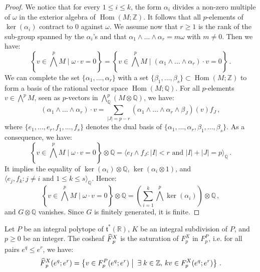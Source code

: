 \documentclass[AHL,Unicode,longabstracts,published]{cedram}
\newcommand{\R}{\mathbb{R}}
\newcommand{\Q}{\mathbb{Q}}
\newcommand{\Z}{\mathbb{Z}}
\renewcommand{\t}{\mathfrak{t}}
\DeclareMathOperator{\Hom}{Hom}
\newcommand{\Fbar}{\hat{F}}
\let\oldhat\hat
\renewcommand*{\hat}[1]{\mathchoice{\widehat{#1}}{\widehat{#1}}{\oldhat{#1}}{\oldhat{#1}}}
\let\oldexists\exists
\renewcommand*{\exists}{\mathrel{\oldexists}}
\begin{document}
\begin{proof}
We notice that for every $1\leq i\leq k$, the form $\alpha_i$ divides a non-zero multiple of $\omega$ in the exterior algebra of $\Hom(M;\Z)$. It follows that all $p$-elements of $\ker(\alpha_i)$ contract to $0$ against $\omega$. We assume now that $r\geq 1$ is the rank of the sub-group spanned by the $\alpha_i$'s and that $\alpha_1\wedge\dots\wedge\alpha_r=m\omega$ with $m\neq 0$. Then we have:
\begin{equation*}
\left\{v\in\bigwedge^pM\;\Big|\;\omega\cdot v=0\right\}=\left\{v\in\bigwedge^pM\;\Big|\;(\alpha_1\wedge\dots\wedge\alpha_r)\cdot v=0\right\}\,.
\end{equation*}
We can complete the set $\{\alpha_1,\dots,\alpha_r\}$ with a set $\{\beta_1,\dots,\beta_s\}\subset\Hom(M;\Z)$ to form a basis of the rational vector space $\Hom(M;\Q)$. For all $p$-elements $v\in\bigwedge^p M$, seen as $p$-vectors in $\bigwedge^p_\Q(M\otimes\Q)$, we have:
\begin{equation*}
(\alpha_1\wedge\dots\wedge\alpha_r)\cdot v = \sum_{|J|=p-r} (\alpha_1\wedge\dots\wedge\alpha_r\wedge\beta_J)(v)f_J\,,
\end{equation*}
where $\{e_1,\dots,e_r,f_1,\dots,f_s\}$ denotes the dual basis of $\{\alpha_1,\dots,\alpha_r,\beta_1,\dots,\beta_s\}$. As a consequence, we have:
\begin{equation*}
\left\{v\in\bigwedge^pM\;\Big|\;\omega\cdot v=0\right\}\otimes\Q=\Big\langle e_I\wedge f_J\colon |I|<r \text{ and }|I|+|J|=p\Big\rangle_\Q\,.
\end{equation*}
It implies the equality of $\ker(\alpha_i)\otimes \Q$, $\ker(\alpha_i\otimes 1)$, and $\langle e_j,f_k\colon j\neq i \text{ and } 1\leq k\leq s\rangle_\Q$. Hence:
\begin{equation*}
\left\{v\in\bigwedge^pM\;\Big|\;\omega\cdot v=0\right\}\otimes\Q=\left(\sum_{i=1}^k\bigwedge^p\ker(\alpha_i)\right)\otimes\Q\,,
\end{equation*}
and $G\otimes \Q$ vanishes. Since $G$ is finitely generated, it is finite.
\end{proof}

\begin{prop}\label{prop:saturation}
Let $P$ be an integral polytope of $\t^*(\R)$, $K$ be an integral subdivision of $P$, and $p\geq 0$ be an integer. The cosheaf $\Fbar_p^X$ is the saturation of $F^X_p$ in $F^P_p$, i.e. for all pairs $e^q\leq e^r$, we have:
\begin{equation*}
\Fbar^X_p(e^q;e^r)=\left\{ v\in F^P_p(e^q;e^r)\;\big|\; \exists k\in\Z,\, kv\in F^X_p(e^q;e^r)\right\}\,.
\end{equation*}
\end{prop}
\end{document}
